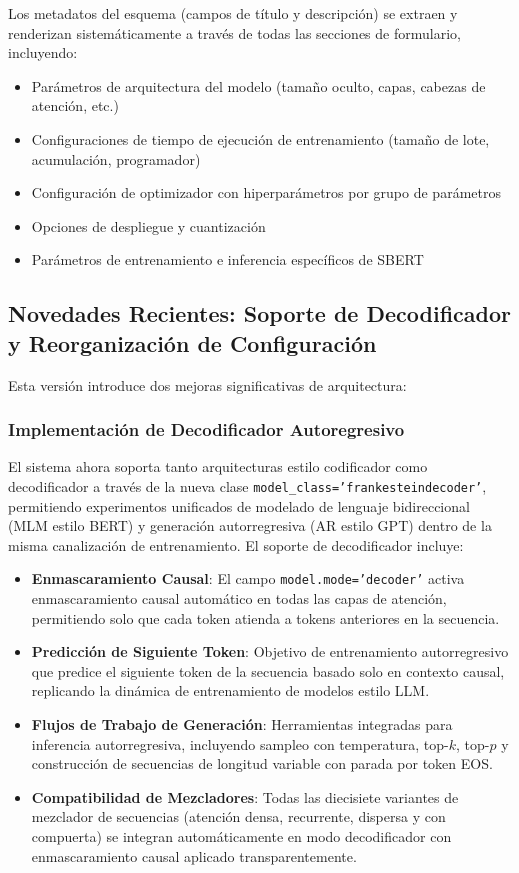 \documentclass[11pt,a4paper]{article}
\begin{document}
Los metadatos del esquema (campos de título y descripción) se extraen y renderizan sistemáticamente a través de todas las secciones de formulario, incluyendo:
\begin{itemize}[leftmargin=*]
    \item Parámetros de arquitectura del modelo (tamaño oculto, capas, cabezas de atención, etc.)
    \item Configuraciones de tiempo de ejecución de entrenamiento (tamaño de lote, acumulación, programador)
    \item Configuración de optimizador con hiperparámetros por grupo de parámetros
    \item Opciones de despliegue y cuantización
    \item Parámetros de entrenamiento e inferencia específicos de SBERT
\end{itemize}

\subsection{Novedades Recientes: Soporte de Decodificador y Reorganización de Configuración}

Esta versión introduce dos mejoras significativas de arquitectura:

\subsubsection{Implementación de Decodificador Autoregresivo}

El sistema ahora soporta tanto arquitecturas estilo codificador como decodificador a través de la nueva clase \texttt{model\_class='frankesteindecoder'}, permitiendo experimentos unificados de modelado de lenguaje bidireccional (MLM estilo BERT) y generación autorregresiva (AR estilo GPT) dentro de la misma canalización de entrenamiento. El soporte de decodificador incluye:

\begin{itemize}[leftmargin=*]
    \item \textbf{Enmascaramiento Causal}: El campo \texttt{model.mode='decoder'} activa enmascaramiento causal automático en todas las capas de atención, permitiendo solo que cada token atienda a tokens anteriores en la secuencia.
    \item \textbf{Predicción de Siguiente Token}: Objetivo de entrenamiento autorregresivo que predice el siguiente token de la secuencia basado solo en contexto causal, replicando la dinámica de entrenamiento de modelos estilo LLM.
    \item \textbf{Flujos de Trabajo de Generación}: Herramientas integradas para inferencia autorregresiva, incluyendo sampleo con temperatura, top-$k$, top-$p$ y construcción de secuencias de longitud variable con parada por token EOS.
    \item \textbf{Compatibilidad de Mezcladores}: Todas las diecisiete variantes de mezclador de secuencias (atención densa, recurrente, dispersa y con compuerta) se integran automáticamente en modo decodificador con enmascaramiento causal aplicado transparentemente.
\end{itemize}
\end{document}
